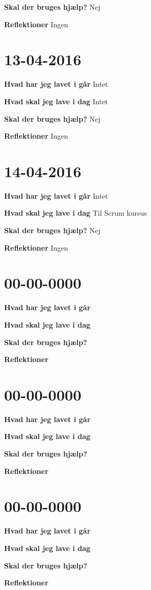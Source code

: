 \documentclass{article}
\begin{document}
	\textbf{Skal der bruges hjælp?} Nej
	
	\textbf{Reflektioner} Ingen
	
	\section{13-04-2016}
	
	\textbf{Hvad har jeg lavet i går} Intet
	
	\textbf{Hvad skal jeg lave i dag} Intet
	
	\textbf{Skal der bruges hjælp?} Nej
	
	\textbf{Reflektioner} Ingen	
	
	\section{14-04-2016}
	
	\textbf{Hvad har jeg lavet i går} Intet
	
	\textbf{Hvad skal jeg lave i dag} Til Scrum kursus
	
	\textbf{Skal der bruges hjælp?} Nej
	
	\textbf{Reflektioner} Ingen
		
	\section{00-00-0000}
	
	\textbf{Hvad har jeg lavet i går}
	
	\textbf{Hvad skal jeg lave i dag}
	
	\textbf{Skal der bruges hjælp?}
	
	\textbf{Reflektioner}
	
	\section{00-00-0000}
	
	\textbf{Hvad har jeg lavet i går}
	
	\textbf{Hvad skal jeg lave i dag}
	
	\textbf{Skal der bruges hjælp?}
	
	\textbf{Reflektioner}
	
	\section{00-00-0000}
	
	\textbf{Hvad har jeg lavet i går}
	
	\textbf{Hvad skal jeg lave i dag}
	
	\textbf{Skal der bruges hjælp?}
	
	\textbf{Reflektioner}
	
		
\end{document}
